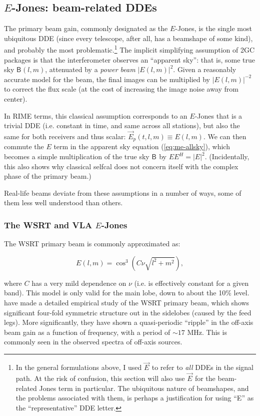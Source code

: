 \documentclass[referee]{aa}
\newcommand{\herm}{H}
\newcommand{\jones}[2]{\vec {#1}_{#2}}
\newcommand{\coh}[2]{\mathsf{{#1}}_{{#2}}}
\begin{document}
\subsection{$E$-Jones: beam-related DDEs\label{sec:EJones}}

The primary beam gain, commonly designated as the $E$-Jones, is the single most ubiquitous DDE (since every telescope, after all, has a beamshape of some kind), and probably the most problematic.\footnote{In the general formulations above, I used $\jones{E}{}$ to refer to {\em all} DDEs in the signal path. At the risk of confusion, this section will also use  $\jones{E}{}$ for the beam-related Jones term in particular. The ubiquitous nature of beamshapes, and the problems associated with them, is perhaps a justification for using ``E'' as the ``representative'' DDE letter.} The implicit simplifying assumption of 2GC packages is that the interferometer observes an ``apparent sky'': that is, some true sky $\coh{B}{}(l,m)$, attenuated by a {\em power beam} $|E(l,m)|^2$. Given a reasonably accurate model for the beam, the final images can be multiplied by $|E(l,m)|^{-2}$ to correct the flux scale (at the cost of increasing the image noise away from center).

In RIME terms, this classical assumption corresponds to an $E$-Jones that is a trivial DDE (i.e. constant in time, and same across all stations), but also the same for both receivers and thus scalar: $\jones{E}{p}(t,l,m) \equiv E(l,m)$. We can then commute the $E$ term in the apparent sky equation (\ref{eq:me-allsky}), which becomes
a simple multiplication of the true sky $\coh{B}{}$ by $EE^\herm=|E|^2.$ (Incidentally, this also shows why classical selfcal does not concern itself with the complex phase of the primary beam.) 

Real-life beams deviate from these assumptions in a number of ways, some of them less well understood than others.

\subsubsection{The WSRT and VLA $E$-Jones\label{sec:EJones:wsrt}\label{sec:EJones:vla}}

The WSRT primary beam is commonly approximated as:

\[
E(l,m) = \cos^3(C\nu\sqrt{l^2+m^2}),
\]

where $C$ has a very mild dependence on $\nu$ (i.e. is effectively constant for a given band). This model is only valid for the main lobe, down to about the 10\% level. \citet{Popping-Braun:WSRT-beam} have made a detailed empirical study of the WSRT primary beam, which shows significant four-fold symmetric structure out in the sidelobes (caused by the feed legs). More significantly, they have shown a quasi-periodic ``ripple'' in the off-axis beam gain as a function of frequency, with a period of $\sim17$ MHz. This is commonly seen in the observed spectra of off-axis sources.
\end{document}
